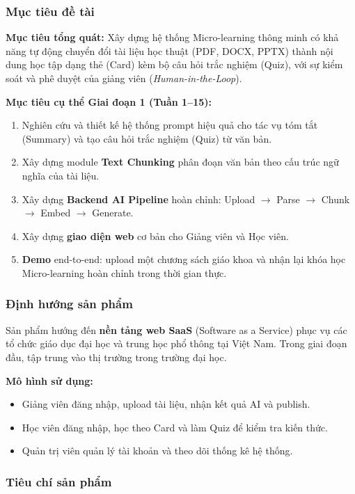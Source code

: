 \subsubsection{Mục tiêu đề tài}

\textbf{Mục tiêu tổng quát:} Xây dựng hệ thống Micro-learning thông minh có
khả năng tự động chuyển đổi tài liệu học thuật (PDF, DOCX, PPTX) thành nội
dung học tập dạng thẻ (Card) kèm bộ câu hỏi trắc nghiệm (Quiz), với sự kiểm
soát và phê duyệt của giảng viên (\textit{Human-in-the-Loop}).

\textbf{Mục tiêu cụ thể Giai đoạn 1 (Tuần 1--15):}
\begin{enumerate}
    \item Nghiên cứu và thiết kế hệ thống prompt hiệu quả cho tác vụ tóm tắt
          (Summary) và tạo câu hỏi trắc nghiệm (Quiz) từ văn bản.
    \item Xây dựng module \textbf{Text Chunking} phân đoạn văn bản theo cấu
          trúc ngữ nghĩa của tài liệu.
    \item Xây dựng \textbf{Backend AI Pipeline} hoàn chỉnh:
          Upload $\to$ Parse $\to$ Chunk $\to$ Embed $\to$ Generate.
    \item Xây dựng \textbf{giao diện web} cơ bản cho Giảng viên và Học viên.
    \item \textbf{Demo} end-to-end: upload một chương sách giáo khoa và nhận
          lại khóa học Micro-learning hoàn chỉnh trong thời gian thực.
\end{enumerate}

\subsubsection{Định hướng sản phẩm}

Sản phẩm hướng đến \textbf{nền tảng web SaaS} (Software as a Service) phục
vụ các tổ chức giáo dục đại học và trung học phổ thông tại Việt Nam. Trong
giai đoạn đầu, tập trung vào thị trường trong trường đại học.

\textbf{Mô hình sử dụng:}
\begin{itemize}
    \item Giảng viên đăng nhập, upload tài liệu, nhận kết quả AI và publish.
    \item Học viên đăng nhập, học theo Card và làm Quiz để kiểm tra kiến thức.
    \item Quản trị viên quản lý tài khoản và theo dõi thống kê hệ thống.
\end{itemize}

\subsubsection{Tiêu chí sản phẩm}

